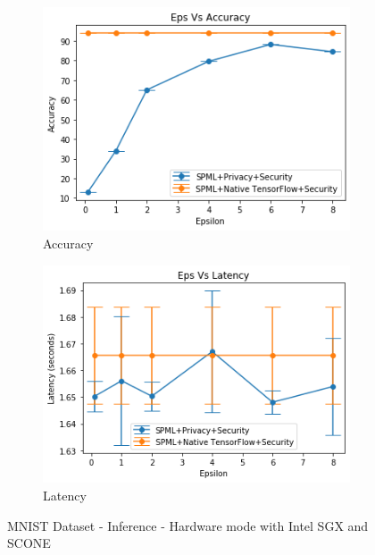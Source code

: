 \begin{figure}
     \begin{subfigure}{0.5\textwidth}
         \includegraphics[width=\textwidth]{images/Inference/MnistHwAccuracyInference.png}
         \caption{Accuracy}
         \label{fig:hwMnistAccuracyInference}
     \end{subfigure}
     \begin{subfigure}{0.5\textwidth}
         \includegraphics[width=\textwidth]{images/Inference/MnistHwLatencyInference.png}
         \caption{Latency}
         \label{fig:hwMnistLatencyInference}
     \end{subfigure}
        \caption{MNIST Dataset - Inference - Hardware mode with Intel SGX and SCONE}
\end{figure}
